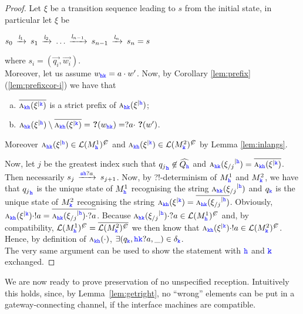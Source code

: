  \begin{proof}
Let $\xi$ be a transition sequence leading to $s$ from the initial state, in particular let $\xi$ be\\
\centerline{
$s_0\lts{\elle_1}s_1\lts{\elle_2} \ldots \lts{\elle_{n-1}}s_{n-1}\lts{\elle_n}s_n=s$
}
where $s_i=({\vec{q_i}},{\vec{w_i}})$.\\
Moreover, let us assume $w_{\HH\KK}= a\cdot w'$.
Now, by Corollary \ref{lem:prefix}(\ref{lem:prefixcor-i}) 
we have that
\begin{enumerate}[a)]
\item 
$\Dual{\symb{\KK\HH}{\restrictup{\xi}{\KK}}}$
 is a strict prefix of
$\symb{\HH\KK}{\restrictup{\xi}{\HH}}$;
\item
$\symb{\HH\KK}{\restrictup{\xi}{\HH}}\setminus \Dual{\symb{\KK\HH}{\restrictup{\xi}{\KK}}}
= \qm({w_{\HH\KK}}) = ?a\cdot  \qm({w'}) $.
\end{enumerate}
Moreover $\symb{\HH\KK}{\restrictup{\xi}{\HH}}\in\lang{M^1_\HH}^\mC$ and
$\symb{\KK\HH}{\restrictup{\xi}{\KK}}\in\lang{M^2_\KK}^\mC$ by Lemma \ref{lem:inlangs}.

Now, let $j$ be the greatest index such that ${q_j}_\HH\not\in\widehat{Q_\HH}$ and 
$\symb{\HH\KK}{\restrictup{\upto{\xi}{j}}{\HH}} = \Dual{\symb{\KK\HH}{\restrictup{\xi}{\KK}}}$.
Then necessarily $s_j\lts{\tts\HH?a} s_{j+1}$.
Now, by ?!-determinism of $M^1_\HH$ and $M^2_\KK$, we have that ${q_j}_\HH$ is the unique state of $M^1_\HH$ recognising the string 
$\symb{\HH\KK}{\restrictup{\upto{\xi}{j}}{\HH}}$ and ${q}_\KK$ is the unique state of $M^2_\KK$ 
recognising the string $\symb{\KK\HH}{\restrictup{\xi}{\KK}} = \Dual{\symb{\HH\KK}{\restrictup{\upto{\xi}{j}}{\HH}}}$.
Obviously, $\symb{\KK\HH}{\restrictup{\xi}{\KK}}\cdot !a =
\Dual{\symb{\HH\KK}{\restrictup{\upto{\xi}{j}}{\HH}}\cdot ?a}$. Because 
 $\symb{\HH\KK}{\restrictup{\upto{\xi}{j}}{\HH}}\cdot ?a \in \lang{M^1_\HH}^\mC$
and, by compatibility,  $\lang{M^1_\HH}^\mC=  \Dual{\lang{M^2_\KK}^\mC}$ we then know that 
$\symb{\KK\HH}{\restrictup{\xi}{\KK}}\cdot !a \in \lang{M^2_\KK}^\mC$.
Hence, by definition of $\symb{\KK\HH}{\cdot}$, $\exists ({q}_\KK,\HH\KK?a,\_)\in\delta_\KK$.\\
 The very same argument can be used to show the statement with $\HH$ and $\KK$ exchanged. 
 \end{proof}
 
 We are now ready to prove preservation of no unspecified reception.
Intuitively this holds, since, by Lemma~\ref{lem:getright}, no ``wrong'' elements can be put
in a gateway-connecting channel, if the interface machines are compatible.   
 


